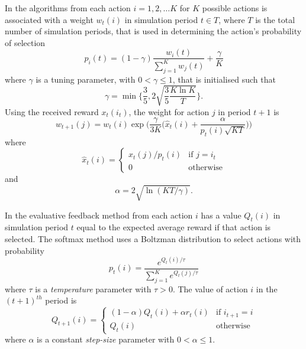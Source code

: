 In the algorithms from \cite{auer:03} each action $i = 1,2,\dotsc K$ for $K$
possible actions is associated with a weight $w_t(i)$ in simulation period $t
\in T$, where $T$ is the total number of simulation periods, that is used in
determining the action's probability of selection
\begin{equation}
p_i(t) = (1 - \gamma) \frac{w_i(t)}{\sum_{j=1}^K w_j(t)} + \frac{\gamma}{K}
\end{equation}
where $\gamma$ is a tuning parameter, with $0 < \gamma \leq 1$, that is
initialised such that
\begin{equation}
\gamma = \min \Biggl\lbrace \frac{3}{5}, 2\sqrt{\frac{3}{5} \frac{K\ln K}{T}}
\Biggr\rbrace .
\end{equation}
Using the received reward $x_t(i_t)$, the weight for action $j$ in period
$t+1$ is
\begin{equation}
w_{t+1}(j) = w_t(i) \exp \biggl(\frac{\gamma}{3K} \biggl(\hat{x}_t(i) +
\frac{\alpha}{p_t(i)\sqrt{KT}}\biggr)\biggr)
\end{equation}
where
\begin{equation}
\hat{x}_t(i) =
\begin{cases}
x_t(j)/p_t(i)& \text{if $j=i_t$}\\
0& \text{otherwise}
\end{cases}\end{equation}
and
\begin{equation}
\alpha = 2\sqrt{\ln(KT/\gamma)}.
\end{equation}

In the evaluative feedback method from \cite[\S2]{suttonbarto:1998} each action
$i$ has a value $Q_t(i)$ in simulation period $t$ equal to the expected average
reward if that action is selected.  The softmax method uses a Boltzman
distribution to select actions with probability
\begin{equation}
p_t(i) = \frac{e^{Q_t(i)/\tau}}{\sum_{j=1}^K e^{Q_t(j)/\tau}}
\end{equation}
where $\tau$ is a \textit{temperature} parameter with $\tau > 0$.  The value of
action $i$ in the $(t+1)^{th}$ period is
\begin{equation}
Q_{t+1}(i) = \begin{cases}
(1-\alpha)Q_t(i) + \alpha r_t(i) & \text{if $i_{t+1}=i$}\\
Q_t(i) & \text{otherwise}
\end{cases}
\end{equation}
where $\alpha$ is a constant \textit{step-size} parameter with $0 < \alpha
\leq 1$.

